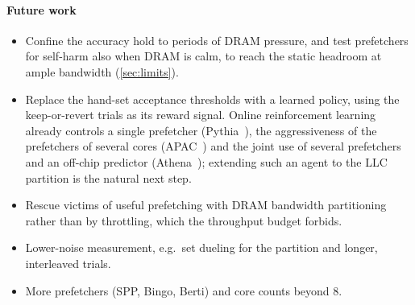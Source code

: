 \paragraph{Future work}
\begin{itemize}
  \item Confine the accuracy hold to periods of DRAM pressure, and test prefetchers for self-harm also when DRAM is
        calm, to reach the static headroom at ample bandwidth (\cref{sec:limits}).
  \item Replace the hand-set acceptance thresholds with a learned policy, using the keep-or-revert trials as its
        reward signal.  Online reinforcement learning already controls a single prefetcher
        (Pythia~\cite{bera2021pythia}), the aggressiveness of the prefetchers of several cores
        (APAC~\cite{yang2025apac}) and the joint use of several prefetchers and an off-chip predictor
        (Athena~\cite{bera2026athena}); extending such an agent to the LLC partition is the natural next step.
  \item Rescue victims of useful prefetching with DRAM bandwidth partitioning~\cite{holtryd2021cbp} rather than by
        throttling, which the throughput budget forbids.
  \item Lower-noise measurement, e.g.\ set dueling for the partition and longer, interleaved trials.
  \item More prefetchers (SPP, Bingo, Berti) and core counts beyond 8.
\end{itemize}
